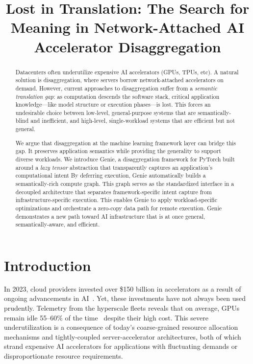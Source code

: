 \newcommand{\sys}{Genie\xspace}
\newcommand{\SemanticFlow}{\textsc{SemanticFlow}}
\newcommand{\lazytensor}{Lazy Tensor\xspace}

\title{Lost in Translation: The Search for Meaning in Network-Attached AI Accelerator Disaggregation}

\begin{abstract}
Datacenters often underutilize expensive AI accelerators (GPUs, TPUs, etc).
A natural solution is disaggregation, where servers borrow network-attached accelerators on demand.
However, current approaches to disaggregation
suffer from a \emph{semantic translation gap}: as computation descends the software stack, critical application knowledge---like model structure or execution phases---is lost.
This forces an undesirable choice between low-level, general-purpose systems that are semantically-blind and inefficient, and high-level, single-workload systems that are efficient but not general.

We argue that disaggregation at the machine learning framework layer 
can bridge this gap.
It preserves application semantics while providing the generality to support diverse workloads.
We introduce \sys, a disaggregation framework for PyTorch built around a \textit{lazy tensor} abstraction that transparently captures an application’s computational intent
By deferring execution, \sys automatically builds a semantically-rich compute graph. 
This graph serves as the standardized interface in a decoupled architecture that separates framework-specific intent capture from infrastructure-specific execution. 
This enables \sys to apply workload-specific optimizations and orchestrate a zero-copy data path for remote execution.
\sys demonstrates a new path toward AI infrastructure that is at once general, semantically-aware, and efficient.
\end{abstract}

\section{Introduction}
\label{sec:introduction}
In 2023, cloud providers invested over \$150 billion in accelerators as a result of ongoing advancements in AI~\cite{datacenter-accelerators-2024}. 
Yet, 
these investments have not always been used prudently.
Telemetry from the hyperscale fleets reveals that on average, GPUs remain idle 55--60\% of the time~\cite{register-gpu-utilization-2024} despite their high cost.
This severe underutilization is a consequence of today's coarse-grained resource allocation mechanisms and tightly-coupled server-accelerator architectures, both of which strand expensive AI accelerators for applications with fluctuating demands or disproportionate resource requirements.


